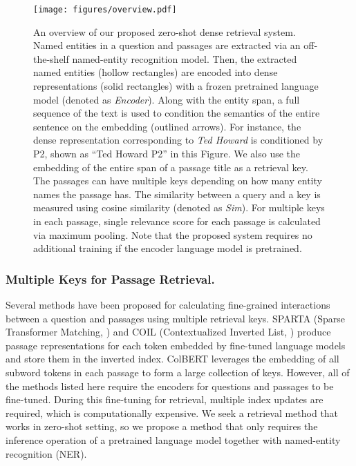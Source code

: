 \documentclass[letterpaper]{article} \usepackage{aaai23}  \usepackage{times}  \usepackage{helvet}  \usepackage{courier}  \usepackage[hyphens]{url}  \usepackage{graphicx} \urlstyle{rm} \def\UrlFont{\rm}  \usepackage{natbib}  \usepackage{caption} \frenchspacing  \setlength{\pdfpagewidth}{8.5in}  \setlength{\pdfpageheight}{11in}  \usepackage{algorithm}
\begin{document}
\begin{figure*}[t]
	\centering
	\texttt{[image: figures/overview.pdf]}
	\caption{
		An overview of our proposed zero-shot dense retrieval system.
		Named entities in a question and passages are extracted via an off-the-shelf named-entity recognition model.
		Then, the extracted named entities (hollow rectangles) are encoded into dense representations (solid rectangles) with a frozen pretrained language model (denoted as \textit{Encoder}).
		Along with the entity span, a full sequence of the text is used to condition the semantics of the entire sentence on the embedding (outlined arrows).
		For instance, the dense representation corresponding to \textit{Ted Howard} is conditioned by P2, shown as ``Ted Howard  P2'' in this Figure.
		We also use the embedding of the entire span of a passage title as a retrieval key.
		The passages can have multiple keys depending on how many entity names the passage has.
		The similarity between a query and a key is measured using cosine similarity (denoted as \textit{Sim}).
		For multiple keys in each passage, single relevance score for each passage is calculated via maximum pooling.
		Note that the proposed system requires no additional training if the encoder language model is pretrained.
	}
	\label{fig:overview}
\end{figure*}


\subsubsection{Multiple Keys for Passage Retrieval.}
Several methods have been proposed for calculating fine-grained interactions between a question and passages using multiple retrieval keys.
SPARTA (Sparse Transformer Matching, \citep{zhao-etal-2021-sparta}) and COIL (Contextualized Inverted List, \citep{gao-etal-2021-coil}) produce passage representations for each token embedded by fine-tuned language models and store them in the inverted index.
ColBERT \citep{khattab-etal-2021-relevance} leverages the embedding of all subword tokens in each passage to form a large collection of keys.
However, all of the methods listed here require the encoders for questions and passages to be fine-tuned.
During this fine-tuning for retrieval, multiple index updates are required, which is computationally expensive.
We seek a retrieval method that works in zero-shot setting, so we propose a method that only requires the inference operation of a pretrained language model together with named-entity recognition (NER).
\end{document}
